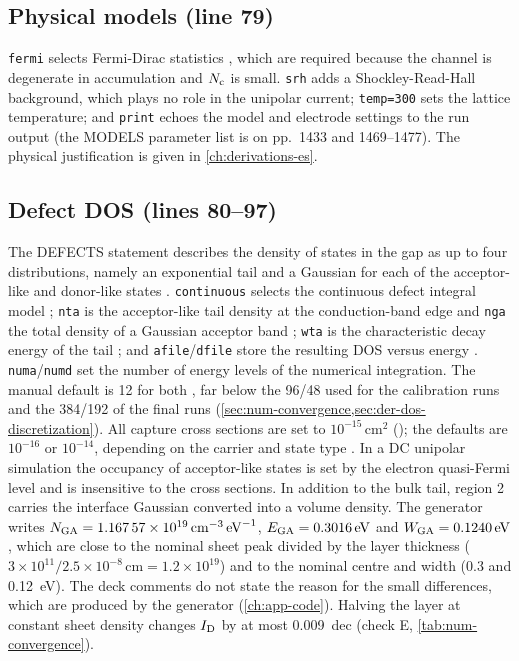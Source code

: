 \subsection{Physical models (line 79)}

\texttt{fermi} selects Fermi-Dirac statistics \citep[pp.~108--109]{AtlasManual}, which are required because the channel
is degenerate in accumulation and $N_{\mathrm{c}}$ is small. \texttt{srh} adds a Shockley-Read-Hall background, which plays no role
in the unipolar current; \texttt{temp=300} sets the lattice temperature; and \texttt{print} echoes the model and
electrode settings to the run output (the MODELS parameter list is on pp.~1433 and 1469--1477). The physical
justification is given in \cref{ch:derivations-es}.

\subsection{Defect DOS (lines 80--97)}

The DEFECTS statement describes the density of states in the gap as up to four distributions, namely an exponential tail
and a Gaussian for each of the acceptor-like and donor-like states \citep[p.~1169]{AtlasManual}. \texttt{continuous}
selects the continuous defect integral model \citep[p.~1169]{AtlasManual}; \texttt{nta} is the acceptor-like tail
density at the conduction-band edge and \texttt{nga} the total density of a Gaussian acceptor band
\citep[p.~1171]{AtlasManual}; \texttt{wta} is the characteristic decay energy of the tail
\citep[p.~1173]{AtlasManual}; and \texttt{afile}/\texttt{dfile} store the resulting DOS versus energy
\citep[pp.~1169--1170]{AtlasManual}. \texttt{numa}/\texttt{numd} set the number of energy levels of the numerical
integration. The manual default is 12 for both \citep[p.~1168]{AtlasManual}, far below the 96/48 used for the
calibration runs and the 384/192 of the final runs (\cref{sec:num-convergence,sec:der-dos-discretization}). All capture
cross sections are set to $10^{-15}\,\mathrm{cm^2}$ (); the defaults are $10^{-16}$ or $10^{-14}$,
depending on the carrier and state type \citep[pp.~1168--1169]{AtlasManual}. In a DC unipolar simulation the occupancy
of acceptor-like states is set by the electron quasi-Fermi level and is insensitive to the cross sections. In addition to
the bulk tail, region 2 carries the interface Gaussian converted into a volume density. The generator writes
$N_{\mathrm{GA}} = \SI{1.16757e19}{cm^{-3}.eV^{-1}}$, $E_{\mathrm{GA}} = \SI{0.3016}{eV}$ and $W_{\mathrm{GA}} = \SI{0.1240}{eV}$, which are close to the
nominal sheet peak divided by the layer thickness ($3\times10^{11}/2.5\times10^{-8}\,\mathrm{cm} = 1.2\times10^{19}$) and
to the nominal centre and width (0.3 and \SI{0.12}{eV}). The deck comments do not state the reason for the small
differences, which are produced by the generator (\cref{ch:app-code}). Halving the layer at constant sheet density
changes $I_{\mathrm{D}}$ by at most \SI{0.009}{dec} (check E, \cref{tab:num-convergence}).

